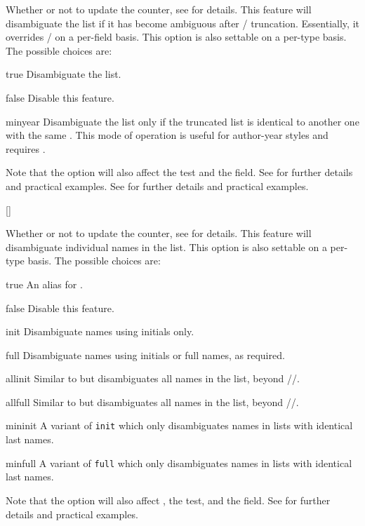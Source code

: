 \documentclass{ltxdockit}[2011/03/25]
\begin{document}
\begin{optionlist}
Whether or not to update the  counter, see  for details. This feature will disambiguate the  list if it has become ambiguous after \slash {} truncation. Essentially, it overrides \slash {} on a per-field basis. This option is also settable on a per-type basis. The possible choices are:

\begin{valuelist}
\item[true] Disambiguate the  list.
\item[false] Disable this feature.
\item[minyear] Disambiguate the  list only if the truncated list is identical to another one with the same . This mode of operation is useful for author-year styles and requires .
\end{valuelist}
%
Note that the  option will also affect the  test and the  field. See  for further details and practical examples. See  for further details and practical examples.

[\BiberOnly]

Whether or not to update the  counter, see  for details. This feature will disambiguate individual names in the  list. This option is also settable on a per-type basis. The possible choices are:

\begin{valuelist}
\item[true] An alias for .
\item[false] Disable this feature.
\item[init] Disambiguate names using initials only.
\item[full] Disambiguate names using initials or full names, as required.
\item[allinit] Similar to  but disambiguates all names in the  list, beyond \slash {}\slash {}.
\item[allfull] Similar to  but disambiguates all names in the  list, beyond \slash {}\slash {}.
\item[mininit] A variant of \texttt{init} which only disambiguates names in lists with identical last names.
\item[minfull] A variant of \texttt{full} which only disambiguates names in lists with identical last names.
\end{valuelist}
%
Note that the  option will also affect , the  test, and the  field. See  for further details and practical examples.

\end{optionlist}
\end{document}
